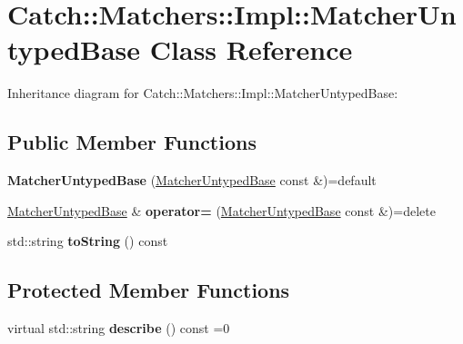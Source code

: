 \hypertarget{classCatch_1_1Matchers_1_1Impl_1_1MatcherUntypedBase}{}\section{Catch\+:\+:Matchers\+:\+:Impl\+:\+:Matcher\+Untyped\+Base Class Reference}
\label{classCatch_1_1Matchers_1_1Impl_1_1MatcherUntypedBase}


Inheritance diagram for Catch\+:\+:Matchers\+:\+:Impl\+:\+:Matcher\+Untyped\+Base\+:
\subsection*{Public Member Functions}
\begin{DoxyCompactItemize}
\item 
\mbox{\label{classCatch_1_1Matchers_1_1Impl_1_1MatcherUntypedBase_a985fd3c3ffcc9f2e8dc7a330130040b0}} 
{\bfseries Matcher\+Untyped\+Base} (\hyperlink{classCatch_1_1Matchers_1_1Impl_1_1MatcherUntypedBase}{Matcher\+Untyped\+Base} const \&)=default
\item 
\mbox{\label{classCatch_1_1Matchers_1_1Impl_1_1MatcherUntypedBase_a62668ccc47b64a9094dcb6413f9af80b}} 
\hyperlink{classCatch_1_1Matchers_1_1Impl_1_1MatcherUntypedBase}{Matcher\+Untyped\+Base} \& {\bfseries operator=} (\hyperlink{classCatch_1_1Matchers_1_1Impl_1_1MatcherUntypedBase}{Matcher\+Untyped\+Base} const \&)=delete
\item 
\mbox{\label{classCatch_1_1Matchers_1_1Impl_1_1MatcherUntypedBase_a5982c7c80ca71dfe2298babadad7a453}} 
std\+::string {\bfseries to\+String} () const
\end{DoxyCompactItemize}
\subsection*{Protected Member Functions}
\begin{DoxyCompactItemize}
\item 
\mbox{\label{classCatch_1_1Matchers_1_1Impl_1_1MatcherUntypedBase_a91d3a907dbfcbb596077df24f6e11fe2}} 
virtual std\+::string {\bfseries describe} () const =0
\end{DoxyCompactItemize}
